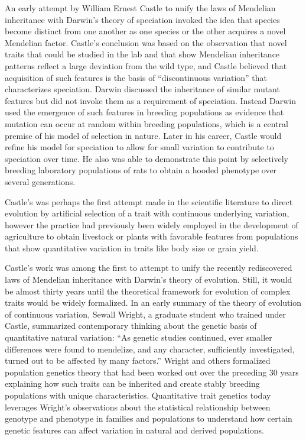 An early attempt by William Ernest Castle to unify the laws of Mendelian inheritance with Darwin's theory of speciation invoked the idea that species become distinct from one another as one species or the other acquires a novel Mendelian factor. Castle's conclusion was based on the observation that novel traits that could be studied in the lab and that show Mendelian inheritance patterns reflect a large deviation from the wild type, and Castle believed that acquisition of such features is the basis of ``discontinuous variation'' that characterizes speciation. Darwin discussed the inheritance of similar mutant features but did not invoke them as a requirement of speciation. Instead Darwin used the emergence of such features in breeding populations as evidence that mutation can occur at random within breeding populations, which is a central premise of his model of selection in nature. Later in his career, Castle would refine his model for speciation to allow for small variation to contribute to speciation over time. He also was able to demonstrate this point by selectively breeding laboratory populations of rats to obtain a hooded phenotype over several generations.

Castle's was perhaps the first attempt made in the scientific literature to direct evolution by artificial selection of a trait with continuous underlying variation, however the practice had previously been widely employed in the development of agriculture to obtain livestock or plants with favorable features from populations that show quantitative variation in traits like body size or grain yield.

Castle's work was among the first to attempt to unify the recently rediscovered laws of Mendelian inheritance with Darwin's theory of evolution. Still, it would be almost thirty years until the theoretical framework for evolution of complex traits would be widely formalized. In an early summary of the theory of evolution of continuous variation, Sewall Wright, a graduate student who trained under Castle, summarized contemporary thinking about the genetic basis of quantitative natural variation: ``As genetic studies continued, ever smaller differences were found to mendelize, and any character, sufficiently investigated, turned out to be affected by many factors.'' Wright and others formalized population genetics theory that had been worked out over the preceding 30 years explaining how such traits can be inherited and create stably breeding populations with unique characteristics. Quantitative trait genetics today leverages Wright's observations about the statistical relationship between genotype and phenotype in families and populations to understand how certain genetic features can affect variation in natural and derived populations.

